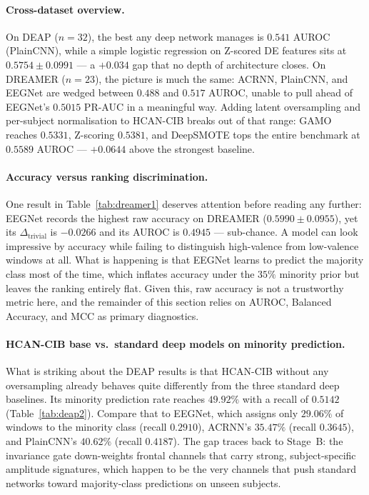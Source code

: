 \documentclass[a4paper,fleqn]{cas-sc}
\begin{document}
\paragraph{Cross-dataset overview.}
On DEAP ($n=32$), the best any deep network manages is $0.541$ AUROC (PlainCNN), while a simple logistic regression on Z-scored DE features sits at $0.5754\pm0.0991$ --- a $+0.034$ gap that no depth of architecture closes. On DREAMER ($n=23$), the picture is much the same: ACRNN, PlainCNN, and EEGNet are wedged between $0.488$ and $0.517$ AUROC, unable to pull ahead of EEGNet's $0.5015$ PR-AUC in a meaningful way. Adding latent oversampling and per-subject normalisation to HCAN-CIB breaks out of that range: GAMO reaches $0.5331$, Z-scoring $0.5381$, and DeepSMOTE tops the entire benchmark at $\mathbf{0.5589}$ AUROC --- $+0.0644$ above the strongest baseline.

\paragraph{Accuracy versus ranking discrimination.}
One result in Table~\ref{tab:dreamer1} deserves attention before reading any further: EEGNet records the highest raw accuracy on DREAMER ($\mathbf{0.5990\pm0.0955}$), yet its $\Delta_{\mathrm{trivial}}$ is $-0.0266$ and its AUROC is $0.4945$ --- sub-chance. A model can look impressive by accuracy while failing to distinguish high-valence from low-valence windows at all. What is happening is that EEGNet learns to predict the majority class most of the time, which inflates accuracy under the $35\%$ minority prior but leaves the ranking entirely flat. Given this, raw accuracy is not a trustworthy metric here, and the remainder of this section relies on AUROC, Balanced Accuracy, and MCC as primary diagnostics.

\paragraph{HCAN-CIB base vs.\ standard deep models on minority prediction.}
What is striking about the DEAP results is that HCAN-CIB without any oversampling already behaves quite differently from the three standard deep baselines. Its minority prediction rate reaches $49.92\%$ with a recall of $0.5142$ (Table~\ref{tab:deap2}). Compare that to EEGNet, which assigns only $29.06\%$ of windows to the minority class (recall $0.2910$), ACRNN's $35.47\%$ (recall $0.3645$), and PlainCNN's $40.62\%$ (recall $0.4187$). The gap traces back to Stage~B: the invariance gate down-weights frontal channels that carry strong, subject-specific amplitude signatures, which happen to be the very channels that push standard networks toward majority-class predictions on unseen subjects.
\end{document}
